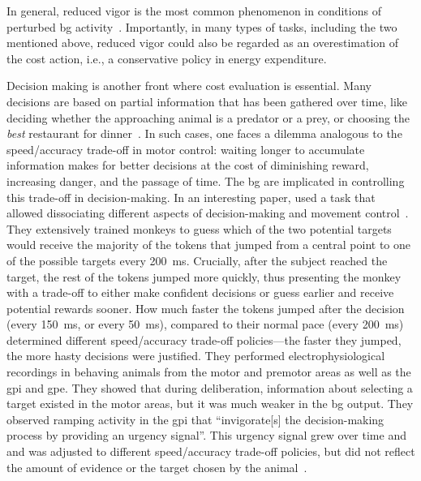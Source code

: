 In general, reduced vigor is the most common phenomenon in conditions of perturbed \gls{bg} activity~\cite{Bailey2006JNeurosci, Rueda2015NN, CastaneAnna2010, Bergstrom2018Cell, Lemke2019NN, Geddes2018Cell, Bailey2006JNeurosci, Hart2018CurrBiol}.
Importantly, in many types of tasks, including the two mentioned above, reduced vigor could also be regarded as an overestimation of the cost action, i.e., a conservative policy in energy expenditure.
\par
Decision making is another front where cost evaluation is essential.
Many decisions are based on partial information that has been gathered over time, like deciding whether the approaching animal is a predator or a prey, or choosing the \textit{best} restaurant for dinner~\cite{Bogacz2010TINS}.
In such cases, one faces a dilemma analogous to the speed/accuracy trade-off in motor control: waiting longer to accumulate information makes for better decisions at the cost of diminishing reward, increasing danger, and the passage of time.
The \gls{bg} are implicated in controlling this trade-off in decision-making.
In an interesting paper, \citeauthor{Thura2017Neruon} used a task that allowed dissociating different aspects of decision-making and movement control~\cite{Thura2017Neruon}.
They extensively trained monkeys to guess which of the two potential targets would receive the majority of the tokens that jumped from a central point to one of the possible targets every 200~ms.
Crucially, after the subject reached the target, the rest of the tokens jumped more quickly, thus presenting the monkey with a trade-off to either make confident decisions or guess earlier and receive potential rewards sooner.
How much faster the tokens jumped after the decision (every 150~ms, or every 50~ms), compared to their normal pace (every 200~ms) determined different speed/accuracy trade-off policies---the faster they jumped, the more hasty decisions were justified.
They performed electrophysiological recordings in behaving animals from the motor and premotor areas as well as the \gls{gpi} and \gls{gpe}.
They showed that during deliberation, information about selecting a target existed in the motor areas, but it was much weaker in the \gls{bg} output.
They observed ramping activity in the \gls{gpi} that ``invigorate[s] the decision-making process by providing an urgency signal''.
This urgency signal grew over time and and was adjusted to different speed/accuracy trade-off policies, but did not reflect the amount of evidence or the target chosen by the animal~\cite{Thura2017Neruon}.
